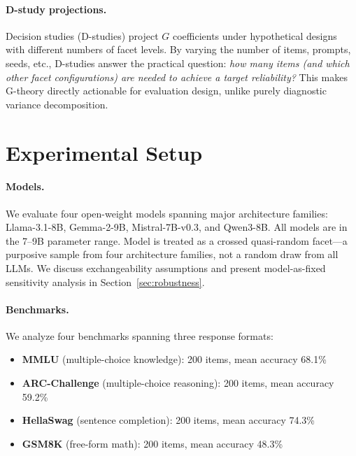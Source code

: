 \documentclass[11pt]{article}
\begin{document}
\paragraph{D-study projections.}
Decision studies (D-studies) project $G$ coefficients under hypothetical designs with different numbers of facet levels.
By varying the number of items, prompts, seeds, etc., D-studies answer the practical question: \emph{how many items (and which other facet configurations) are needed to achieve a target reliability?}
This makes G-theory directly actionable for evaluation design, unlike purely diagnostic variance decomposition.

\section{Experimental Setup}
\label{sec:setup}

\paragraph{Models.}
We evaluate four open-weight models spanning major architecture families: Llama-3.1-8B, Gemma-2-9B, Mistral-7B-v0.3, and Qwen3-8B.
All models are in the 7--9B parameter range.
Model is treated as a crossed quasi-random facet---a purposive sample from four architecture families, not a random draw from all LLMs.
We discuss exchangeability assumptions and present model-as-fixed sensitivity analysis in Section~\ref{sec:robustness}.

\paragraph{Benchmarks.}
We analyze four benchmarks spanning three response formats:
\begin{itemize}[topsep=2pt,itemsep=1pt]
  \item \textbf{MMLU} (multiple-choice knowledge): 200 items, mean accuracy 68.1\%
  \item \textbf{ARC-Challenge} (multiple-choice reasoning): 200 items, mean accuracy 59.2\%
  \item \textbf{HellaSwag} (sentence completion): 200 items, mean accuracy 74.3\%
  \item \textbf{GSM8K} (free-form math): 200 items, mean accuracy 48.3\%
\end{itemize}
\end{document}
